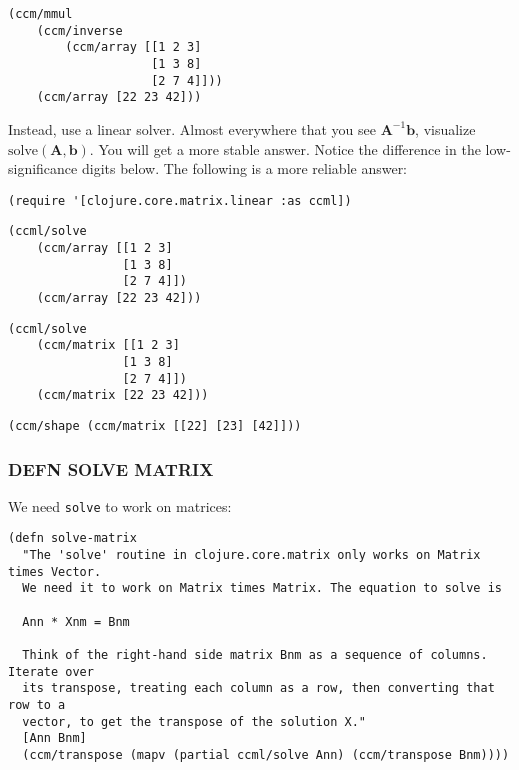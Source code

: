 \documentclass[10pt,oneside,x11names]{article}
\begin{document}
\begin{verbatim}
(ccm/mmul
    (ccm/inverse
        (ccm/array [[1 2 3]
                    [1 3 8]
                    [2 7 4]]))
    (ccm/array [22 23 42]))
\end{verbatim}

Instead, use a linear solver. Almost everywhere that you see
\(\boldsymbol{A}^{-1}\boldsymbol{b}\), visualize
\(\text{solve}(\boldsymbol{A},\boldsymbol{b})\). You will get a more
stable answer. Notice the difference in the low-significance digits
below. The following is a more reliable answer:

\begin{verbatim}
(require '[clojure.core.matrix.linear :as ccml])
\end{verbatim}

\begin{verbatim}
(ccml/solve
    (ccm/array [[1 2 3]
                [1 3 8]
                [2 7 4]])
    (ccm/array [22 23 42]))
\end{verbatim}

\begin{verbatim}
(ccml/solve
    (ccm/matrix [[1 2 3]
                [1 3 8]
                [2 7 4]])
    (ccm/matrix [22 23 42]))
\end{verbatim}

\begin{verbatim}
(ccm/shape (ccm/matrix [[22] [23] [42]]))
\end{verbatim}

\subsubsection{DEFN SOLVE MATRIX}
\label{sec:orge977a21}

We need \texttt{solve} to work on matrices:

\begin{verbatim}
(defn solve-matrix
  "The 'solve' routine in clojure.core.matrix only works on Matrix times Vector.
  We need it to work on Matrix times Matrix. The equation to solve is

  Ann * Xnm = Bnm

  Think of the right-hand side matrix Bnm as a sequence of columns. Iterate over
  its transpose, treating each column as a row, then converting that row to a
  vector, to get the transpose of the solution X."
  [Ann Bnm]
  (ccm/transpose (mapv (partial ccml/solve Ann) (ccm/transpose Bnm))))
\end{verbatim}
\end{document}
